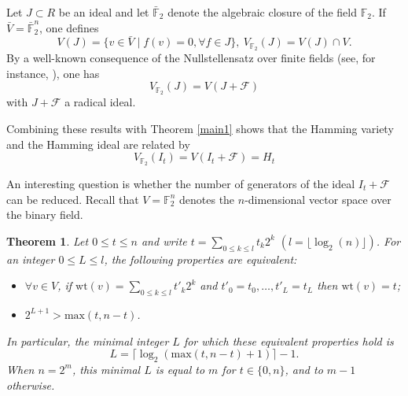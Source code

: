 \documentclass{amsart}
\newtheorem{theorem}{Theorem}[section]
\def\FF{{\mathbb F}}
\def\wt{{\mathrm{wt}}}
\def\cF{{\mathcal{F}}}
\def\max{{\mathrm{max}}}
\begin{document}
\medskip
Let $J\subset R$ be an ideal and let $\bar{\FF}_2$ denote the algebraic
closure of the field $\FF_2$. If $\bar{V} = \bar{\FF}_2^n$, one defines
\[
V(J) = \{ v\in \bar{V}\mid f(v) = 0, \forall f\in J\},\
V_{\FF_2}(J) = V(J)\cap V.
\]
By a well-known consequence of the Nullstellensatz over finite fields (see,
for instance, \cite{Gh}), one has
\[
V_{\FF_2}(J) = V(J + \cF)
\]
with $J + \cF$ a radical ideal.

Combining these results with Theorem \ref{main1} shows that the Hamming variety
and the Hamming ideal are related by
\[
V_{\FF_2}(I_t) = V(I_t + \cF) = H_t
\]

An interesting question is whether the number of generators of the ideal $I_t + \cF$ can
be reduced. Recall that $V = \FF_2^n$ denotes the $n$-dimensional vector space over the binary
field.

\begin{theorem}
Let $0\leq t\leq n$ and write $t = \sum_{0\leq k\leq l} t_k 2^k$ $(l = \lfloor \log_2(n) \rfloor)$.
For an integer $0\leq L\leq l$, the following properties are equivalent:
\begin{itemize}
\item[$(1)$] $\forall v \in V$, if $\wt(v) = \sum_{0\leq k\leq l} t'_k 2^k$ and
$t'_0 = t_0,\ldots,t'_L = t_L$ then $\wt(v) = t$;
\item[$(2)$] $2^{L+1} > \max(t, n-t)$.
\end{itemize}
In particular, the minimal integer $L$ for which these equivalent properties hold is
\[
L = \lceil \log_2( \max(t,n-t) + 1 ) \rceil - 1.
\]
When $n = 2^m$, this minimal $L$ is equal to $m$ for $t \in \{0,n\}$, and to $m-1$ otherwise.
\end{theorem}
\end{document}
